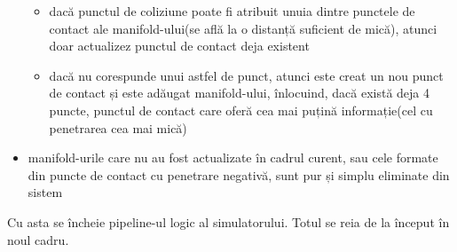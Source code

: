 \documentclass[12pt,a4paper]{report}
\begin{document}
\begin{itemize}
\begin{itemize}
		\item dacă punctul de coliziune poate fi atribuit unuia dintre punctele de contact ale manifold-ului(se află la o distanță suficient de mică), atunci doar actualizez punctul de contact deja existent
		\item dacă nu corespunde unui astfel de punct, atunci este creat un nou punct de contact și este adăugat manifold-ului, înlocuind, dacă există deja 4 puncte, punctul de contact care oferă cea mai puțină informație(cel cu penetrarea cea mai mică)
	\end{itemize}
	\item manifold-urile care nu au fost actualizate în cadrul curent, sau cele formate din puncte de contact cu penetrare negativă, sunt pur și simplu eliminate din sistem
\end{itemize}

Cu asta se încheie pipeline-ul logic al simulatorului. Totul se reia de la început în noul cadru.
\end{document}
